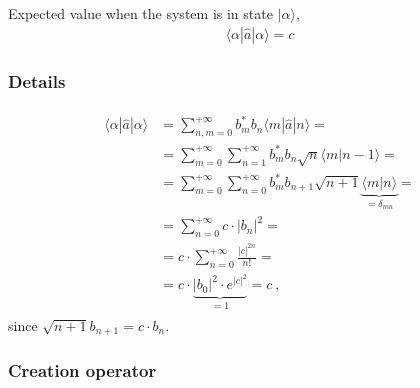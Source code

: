 \documentclass[letterpaper,10pt,english]{jupyterBook}
\begin{document}
\sphinxAtStartPar
Expected value when the system is in state \(| \alpha \rangle\),
\begin{equation*}
\begin{split}\langle \alpha | \hat{a} | \alpha \rangle = c \end{split}
\end{equation*}\subsubsection*{Details}
\begin{equation*}
\begin{split}\begin{aligned}
  \langle \alpha | \hat{a} | \alpha \rangle 
  & = \sum_{n,m=0}^{+\infty} b_m^* b_n \langle m | \hat{a} | n \rangle = \\
  & = \sum_{m=0}^{+\infty} \sum_{n=1}^{+\infty} b_m^* b_n \sqrt{n} \langle m | n - 1 \rangle = \\
  & = \sum_{m=0}^{+\infty} \sum_{n=0}^{+\infty} b_m^* b_{n+1} \sqrt{n+1} \underbrace{\langle m | n \rangle}_{=\delta_{mn}} = \\
  & = \sum_{n=0}^{+\infty} c \cdot |b_n|^2 = \\
  & = c \cdot \sum_{n=0}^{+\infty} \frac{|c|^{2n}}{n!} = \\
  & = c \cdot \underbrace{|b_0|^2 \cdot e^{|c|^2}}_{=1} = c \ ,
\end{aligned}\end{split}
\end{equation*}
\sphinxAtStartPar
since \(\sqrt{n+1} b_{n+1} = c \cdot b_n\).
\subsubsection*{Creation operator}
\end{document}
